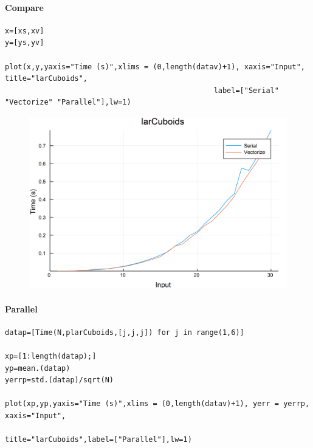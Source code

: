 \documentclass{article}
\begin{document}
\paragraph{Compare}
\begin{flushleft}\small
\begin{list}{}{} \item
    \begin{Verbatim}[tabsize=4]
x=[xs,xv]
y=[ys,yv]

plot(x,y,yaxis="Time (s)",xlims = (0,length(datav)+1), xaxis="Input", title="larCuboids",
                                                label=["Serial" "Vectorize" "Parallel"],lw=1)

    \end{Verbatim}
\end{list}
\end{flushleft}   

\begin{figure}[h!]
\centering
\includegraphics[scale=0.06]{larCuboidsCom1.png}
\end{figure}

\paragraph{Parallel}
\begin{flushleft}\small
\begin{list}{}{} \item
    \begin{Verbatim}[tabsize=4]
datap=[Time(N,plarCuboids,[j,j,j]) for j in range(1,6)]

xp=[1:length(datap);]
yp=mean.(datap)
yerrp=std.(datap)/sqrt(N)

plot(xp,yp,yaxis="Time (s)",xlims = (0,length(datav)+1), yerr = yerrp, xaxis="Input", 
                                                title="larCuboids",label=["Parallel"],lw=1)
 \end{Verbatim}
\end{list}
\end{flushleft}   
\end{document}
